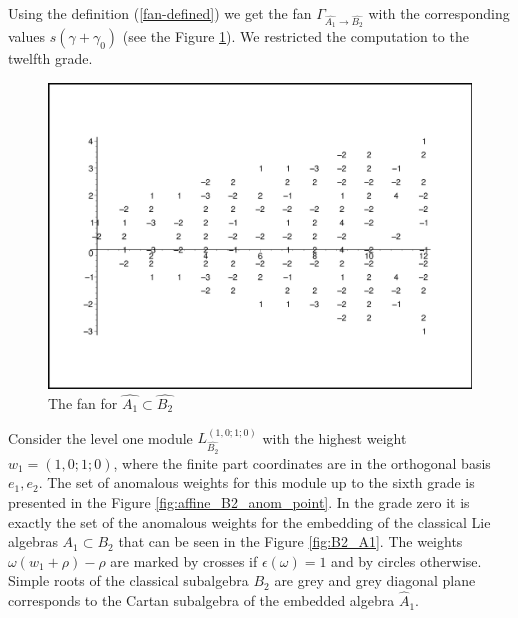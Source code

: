 \documentclass[12pt]{iopart}
\theoremstyle{definition}
\theoremstyle{definition}
\theoremstyle{definition}
\theoremstyle{definition}
\begin{document}
Using the definition (\ref{fan-defined}) we get the fan
$\Gamma_{\hat{A_1} \longrightarrow  \hat{B_2} }$
with the corresponding values $s(\gamma+\gamma_0)$ (see the Figure \ref{fig:AffineB2A1Fan}).
We restricted the computation to the twelfth grade.
\begin{figure}[h!bt]
  \centering
  \includegraphics[width=135mm]{figure10.eps}
  \caption{The fan for $\hat{A_1}\subset \hat{B_2}$}
  \label{fig:AffineB2A1Fan}
\end{figure}


Consider the level one module $L^{\left( 1,0;1;0 \right)}_{\hat{B_2}}$  with the highest weight $w_1=(1,0;1;0)$,
where the finite part coordinates are in the orthogonal basis $e_1,e_2$.
The set of anomalous weights for this module up to the sixth grade is presented in the Figure \ref{fig:affine_B2_anom_point}.
In the grade zero it is exactly the set of the anomalous weights for the embedding of
the classical Lie algebras $A_1\subset B_2$ that can be seen in the  Figure \ref{fig:B2_A1}.
The weights $\omega (w_1+\rho)-\rho$ are marked by crosses if $\epsilon(\omega)=1$ and by circles otherwise.
Simple roots of the classical subalgebra $B_2$ are grey and grey diagonal plane corresponds to the Cartan subalgebra
of the embedded algebra $\hat{A}_1$.
\end{document}
